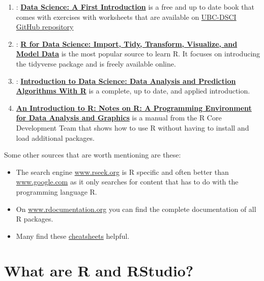 \documentclass[
  12pt,
  oneside]{book}
\providecommand{\tightlist}{%
  \setlength{\itemsep}{0pt}\setlength{\parskip}{0pt}}
\begin{document}
\begin{enumerate}
\def\labelenumi{\arabic{enumi}.}
\tightlist
\item
  \citet{Timbers2022Data}: \href{https://datasciencebook.ca/}{\textbf{Data Science: A First Introduction}} is a free and up to date book that comes with exercises with worksheets that are available on \href{https://github.com/UBC-DSCI/data-science-a-first-intro-worksheets}{UBC-DSCI GitHub repository}
\item
  \citet{Wickham2023R}: \href{https://r4ds.hadley.nz/}{\textbf{R for Data Science: Import, Tidy, Transform, Visualize, and Model Data}} is the most popular source to learn R. It focuses on introducing the tidyverse package and is freely available online.
\item
  \citet{Irizarry2022Introduction}: \href{http://rafalab.dfci.harvard.edu/dsbook/}{\textbf{Introduction to Data Science: Data Analysis and Prediction Algorithms With R}} is a complete, up to date, and applied introduction.
\item
  \citet{Venables2022Introduction} \href{https://cran.r-project.org/doc/manuals/r-release/R-intro.pdf}{\textbf{An Introduction to R: Notes on R: A Programming Environment for Data Analysis and Graphics}} is a manual from the R Core Development Team that shows how to use R without having to install and load additional packages.
\end{enumerate}

Some other sources that are worth mentioning are these:

\begin{itemize}
\tightlist
\item
  The search engine \href{http://www.rseek.org}{www.rseek.org} is R specific and often better than \href{http://www.google.com}{www.google.com} as it only searches for content that has to do with the programming language R.
\item
  On \href{http://www.rdocumentation.org}{www.rdocumentation.org} you can find the complete documentation of all R packages.
\item
  Many find these \href{https://rstudio.com/resources/cheatsheets/}{cheatsheets} helpful.
\end{itemize}

\hypertarget{r-rstudio}{%
\section{What are R and RStudio?}\label{r-rstudio}}
\end{document}
